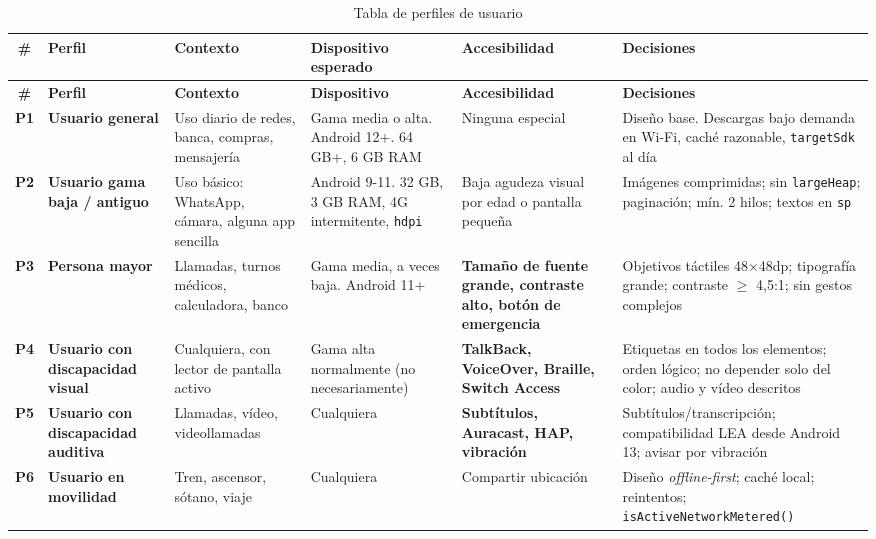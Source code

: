 \documentclass[11pt,a4paper]{article}
\newcommand{\code}[1]{\texttt{\color{navylight}#1}}
\begin{document}
	{\footnotesize
		\begin{xltabular}{\textwidth}{@{}c >{\RaggedRight\arraybackslash}p{2.4cm} >{\RaggedRight\arraybackslash}p{2.5cm} >{\RaggedRight\arraybackslash}p{2.7cm} >{\RaggedRight\arraybackslash}p{2.7cm} >{\RaggedRight\arraybackslash}X@{}}
			\caption{Tabla de perfiles de usuario}\label{tab:perfiles}\\
			\toprule
			\textcolor{paper}{\sffamily\bfseries \#} & \textcolor{paper}{\sffamily\bfseries Perfil} & \textcolor{paper}{\sffamily\bfseries Contexto} & \textcolor{paper}{\sffamily\bfseries Dispositivo esperado} & \textcolor{paper}{\sffamily\bfseries Accesibilidad} & \textcolor{paper}{\sffamily\bfseries Decisiones} \\
			\midrule
			\endfirsthead
			\toprule
			\textcolor{paper}{\sffamily\bfseries \#} & \textcolor{paper}{\sffamily\bfseries Perfil} & \textcolor{paper}{\sffamily\bfseries Contexto} & \textcolor{paper}{\sffamily\bfseries Dispositivo} & \textcolor{paper}{\sffamily\bfseries Accesibilidad} & \textcolor{paper}{\sffamily\bfseries Decisiones} \\
			\midrule
			\endhead
			\bottomrule
			\endlastfoot
			\textbf{P1} & \textbf{Usuario general} & Uso diario de redes, banca, compras, mensajería & Gama media o alta. Android 12+. 64 GB+, 6 GB RAM & Ninguna especial & Diseño base. Descargas bajo demanda en Wi-Fi, caché razonable, \code{targetSdk} al día \\
			\textbf{P2} & \textbf{Usuario gama baja / antiguo} & Uso básico: WhatsApp, cámara, alguna app sencilla & Android 9-11. 32 GB, 3 GB RAM, 4G intermitente, \code{hdpi} & Baja agudeza visual por edad o pantalla pequeña & Imágenes comprimidas; sin \code{largeHeap}; paginación; mín. 2 hilos; textos en \code{sp} \\
			\textbf{P3} & \textbf{Persona mayor} & Llamadas, turnos médicos, calculadora, banco & Gama media, a veces baja. Android 11+ & \textbf{Tamaño de fuente grande, contraste alto, botón de emergencia} & Objetivos táctiles 48$\times$48dp; tipografía grande; contraste $\geq$ 4,5:1; sin gestos complejos \\
			\textbf{P4} & \textbf{Usuario con discapacidad visual} & Cualquiera, con lector de pantalla activo & Gama alta normalmente (no necesariamente) & \textbf{TalkBack, VoiceOver, Braille, Switch Access} & Etiquetas en todos los elementos; orden lógico; no depender solo del color; audio y vídeo descritos \\
			\textbf{P5} & \textbf{Usuario con discapacidad auditiva} & Llamadas, vídeo, videollamadas & Cualquiera & \textbf{Subtítulos, Auracast, HAP, vibración} & Subtítulos/transcripción; compatibilidad LEA desde Android 13; avisar por vibración \\
			\textbf{P6} & \textbf{Usuario en movilidad} & Tren, ascensor, sótano, viaje & Cualquiera & Compartir ubicación & Diseño \emph{offline-first}; caché local; reintentos; \code{isActiveNetworkMetered()} \\
		\end{xltabular}
	}
	
\end{document}
